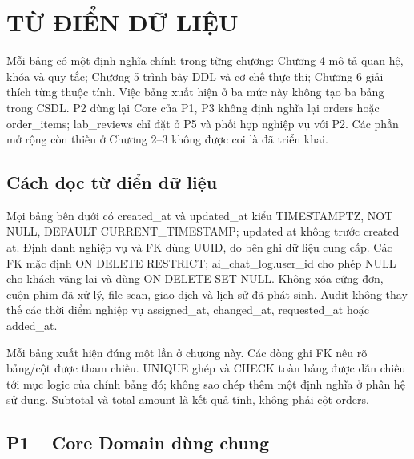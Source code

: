 \chapter{TỪ ĐIỂN DỮ LIỆU}

Mỗi bảng có một định nghĩa chính trong từng chương: Chương 4 mô tả quan hệ,
khóa và quy tắc; Chương 5 trình bày DDL và cơ chế thực thi; Chương 6 giải
thích từng thuộc tính. Việc bảng xuất hiện ở ba mức này không tạo ba bảng
trong CSDL. P2 dùng lại Core của P1, P3 không định nghĩa lại orders hoặc
order\_items; lab\_reviews chỉ đặt ở P5 và phối hợp nghiệp vụ với P2.
Các phần mở rộng còn thiếu ở Chương 2--3 không được coi là đã triển khai.
\section{Cách đọc từ điển dữ liệu}

Mọi bảng bên dưới có created\_at và updated\_at kiểu TIMESTAMPTZ, NOT NULL,
DEFAULT CURRENT\_TIMESTAMP; updated at không trước created at. Định danh
nghiệp vụ và FK dùng UUID, do bên ghi dữ liệu cung cấp. Các FK mặc định
ON DELETE RESTRICT; ai\_chat\_log.user\_id cho phép NULL cho khách vãng lai
và dùng ON DELETE SET NULL. Không xóa cứng đơn, cuộn phim đã xử lý, file
scan, giao dịch và lịch sử đã phát sinh. Audit không thay thế các thời
điểm nghiệp vụ assigned\_at, changed\_at, requested\_at hoặc added\_at.

Mỗi bảng xuất hiện đúng một lần ở chương này. Các dòng ghi FK nêu rõ
bảng/cột được tham chiếu. UNIQUE ghép và CHECK toàn bảng được dẫn chiếu
tới mục logic của chính bảng đó; không sao chép thêm một định nghĩa ở
phân hệ sử dụng. Subtotal và total amount là kết quả tính, không phải cột orders.
\section{P1 -- Core Domain dùng chung}

